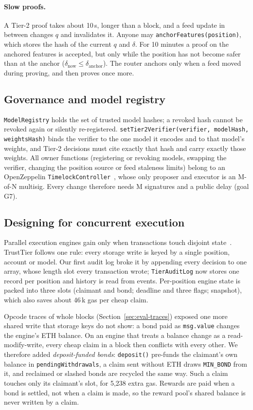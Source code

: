 \documentclass[sigconf,nonacm]{acmart}
\newcommand{\code}[1]{\texttt{\smaller #1}}
\begin{document}
\paragraph{Slow proofs.} A Tier-2 proof takes about 10\,s, longer than a block, and a feed update in between changes $q$ and invalidates it. Anyone may \code{anchorFeatures(position)}, which stores the hash of the current $q$ and $\delta$. For 10 minutes a proof on the anchored features is accepted, but only while the position has not become safer than at the anchor ($\delta_\mathrm{now}\le\delta_\mathrm{anchor}$). The router anchors only when a feed moved during proving, and then proves once more.

\subsection{Governance and model registry}

\code{ModelRegistry} holds the set of trusted model hashes; a revoked hash cannot be revoked again or silently re-registered. \code{setTier2Verifier(verifier, modelHash, weightsHash)} binds the verifier to the one model it encodes and to that model's weights, and Tier-2 decisions must cite exactly that hash and carry exactly those weights. All owner functions (registering or revoking models, swapping the verifier, changing the position source or feed staleness limits) belong to an OpenZeppelin \code{TimelockController}~\cite{ozTimelock}, whose only proposer and executor is an M-of-N multisig. Every change therefore needs M signatures and a public delay (goal G7).

\subsection{Designing for concurrent execution}
\label{sec:design-concurrency}

Parallel execution engines gain only when transactions touch disjoint state~\cite{gelashvili2023blockstm,saraph2020empirical}. TrustTier follows one rule: every storage write is keyed by a single position, account or model. Our first audit log broke it by appending every decision to one array, whose length slot every transaction wrote; \code{TierAuditLog} now stores one record per position and history is read from events. Per-position engine state is packed into three slots (claimant and bond; deadline and three flags; snapshot), which also saves about 46\,k gas per cheap claim.

Opcode traces of whole blocks (Section~\ref{sec:eval-traces}) exposed one more shared write that storage keys do not show: a bond paid as \code{msg.value} changes the engine's ETH balance. On an engine that treats a balance change as a read-modify-write, every cheap claim in a block then conflicts with every other. We therefore added \emph{deposit-funded bonds}: \code{deposit()} pre-funds the claimant's own balance in \code{pendingWithdrawals}, a claim sent without ETH draws \code{MIN\_BOND} from it, and reclaimed or slashed bonds are recycled the same way. Such a claim touches only its claimant's slot, for 5,238 extra gas. Rewards are paid when a bond is settled, not when a claim is made, so the reward pool's shared balance is never written by a claim.
\end{document}
